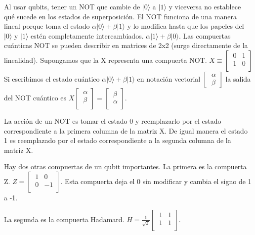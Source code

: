 \documentclass[11pt,a4paper]{article}
\begin{document}
Al usar qubits, tener un NOT que cambie de $\vert 0\rangle$ a $\vert 1\rangle$ y viceversa no establece qué sucede en los estados de superposición. 
El NOT funciona de una manera lineal porque toma el estado 
 $\alpha \vert 0\rangle + \beta \vert 1\rangle$
 y lo modifica hasta que los papeles del $\vert 0\rangle$ y $\vert 1\rangle$ estén completamente intercambiados. 
  $\alpha \vert 1\rangle + \beta \vert 0\rangle$. 
Las compuertas cuánticas NOT se pueden describir en matrices de 2x2 (surge directamente de la linealidad). Supongamos que la X representa una compuerta NOT. 
$X \equiv \begin{bmatrix}
		\ 0 & 1 \\
		\ 1 & 0 \\
	      \end{bmatrix}$
Si escribimos el estado cuántico $\alpha \vert 0\rangle + \beta \vert 1\rangle$ en notación vectorial
$
\begin{bmatrix}
 \ \alpha \\
 \ \beta
 \end{bmatrix}
$
la salida del NOT cuántico es 
$X \begin{bmatrix} 
     \ \alpha \\
     \ \beta  \\
 \end{bmatrix}
 = \begin{bmatrix}
 \ \beta  \\
 \ \alpha \\
 \end{bmatrix}$.
 
La acción de un NOT es tomar el estado 0 y reemplazarlo por el estado correspondiente a la primera columna de la matriz X. De igual manera el estado 1 es reemplazado por el estado correspondiente a la segunda columna de la matriz X. 

Hay dos otras compuertas de un qubit importantes. 
La primera es la compuerta Z. 
$Z = \begin{bmatrix}
 \ 1 & 0  \\
 \ 0 & -1 \\
 \end{bmatrix}$.
Esta compuerta deja el 0 sin modificar y cambia el signo de 1 a -1.

La segunda es la compuerta Hadamard.
$H =  \frac{1}{\sqrt{2}}  \begin{bmatrix}
             \ 1 & 1 \\
             \ 1 & 1 \\
           \end{bmatrix}$.
\end{document}
